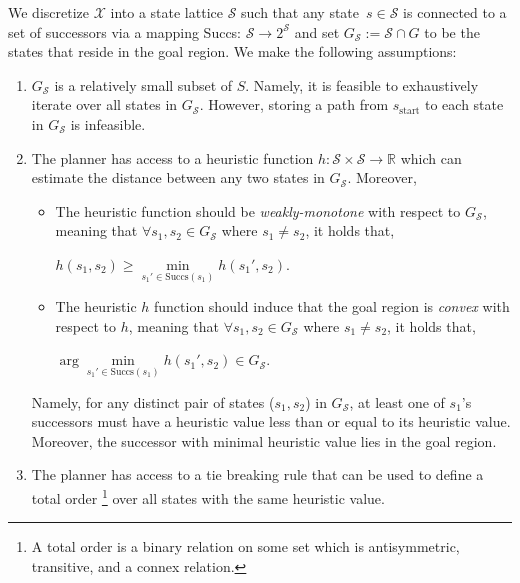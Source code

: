 \documentclass[letterpaper]{article} %
\newcommand{\calX}{\ensuremath{\mathcal{X}}\xspace}
\newcommand{\calS}{\ensuremath{\mathcal{S}}\xspace}
\newcommand{\sStart}{\ensuremath{s_{\text{start}}\xspace}}
\begin{document}
We discretize $\calX$ into a state lattice $\calS$ such that any state~$s \in \calS$ is connected to a set of successors via a mapping Succs: $\calS \rightarrow 2^\calS$
and set $G_\calS := \calS \cap G$ to be the states that reside in the goal region.
We make the following assumptions:

\begin{enumerate}[label={\textbf{A\arabic*}}]
  \item \label{assum:1} $G_\calS$ is a relatively small subset of $S$. Namely, it is feasible to exhaustively iterate over all states in $G_\calS$.
However, storing a path from $\sStart$ to each state in $G_\calS$ is infeasible.
  
  \item \label{assum:2} The planner has access to a heuristic function $h: \calS \times \calS \rightarrow \mathbb{R}$ which can estimate the distance between any two states in $G_\calS$. Moreover, 
 \begin{itemize}
 	\item The heuristic function should be \textit{weakly-monotone} with respect to $G_\calS$, meaning that $\forall s_1, s_2  \in G_\calS$ where $s_1 \neq s_2 $, it holds that,
  \begin{center}
    $h(s_1, s_2) \geq \min\limits_{s_1' \in \text{Succs}(s_1)} h(s_1', s_2)$.
  \end{center}

	\item The heuristic $h$ function should induce that the goal region is \emph{convex} with respect to $h$, meaning that $\forall s_1, s_2  \in G_\calS$ where $s_1 \neq s_2 $, it holds that,
  \begin{center}
     $\arg \min \limits_{s_1' \in \text{Succs}(s_1)} h(s_1', s_2) \in G_\calS$.
  \end{center}

 \end{itemize}
 Namely, for any distinct pair of states ($s_1, s_2$) in $G_\calS$, at least one of $s_1$'s successors  must have a heuristic value less than or equal to its heuristic value.
 Moreover, the successor with minimal heuristic value lies in the goal region.


  \item \label{assum:3} The planner has access to a tie breaking rule that can be used to define a total order \footnote{A total order is a binary relation on some set which is antisymmetric, transitive, and a connex relation.} over all states with the same heuristic value.
  \end{enumerate}
\end{document}
